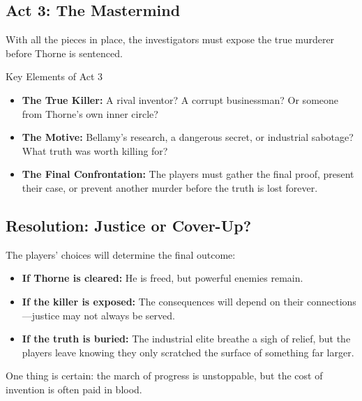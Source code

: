 \subsection{Act 3: The Mastermind}

With all the pieces in place, the investigators must expose the true murderer before Thorne is sentenced.

\begin{Example}{Key Elements of Act 3}
    \begin{itemize}\raggedright
        \item \textbf{The True Killer:} A rival inventor? A corrupt businessman? Or someone from Thorne’s own inner circle?
        \item \textbf{The Motive:} Bellamy’s research, a dangerous secret, or industrial sabotage? What truth was worth killing for?
        \item \textbf{The Final Confrontation:} The players must gather the final proof, present their case, or prevent another murder before the truth is lost forever.
    \end{itemize}
\end{Example}

\subsection{Resolution: Justice or Cover-Up?}  
The players’ choices will determine the final outcome:

\begin{itemize}
    \item \textbf{If Thorne is cleared:} He is freed, but powerful enemies remain.
    \item \textbf{If the killer is exposed:} The consequences will depend on their connections—justice may not always be served.
    \item \textbf{If the truth is buried:} The industrial elite breathe a sigh of relief, but the players leave knowing they only scratched the surface of something far larger.
\end{itemize}

One thing is certain: the march of progress is unstoppable, but the cost of invention is often paid in blood.